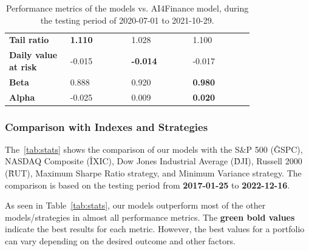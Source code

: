 \documentclass[../xlapes02]{subfiles}
\begin{document}
\begin{table}[h!]
{\begin{tabular}{*{4}{|m{0.20\linewidth}|}}
                \bfseries Tail ratio          & \color[HTML]{00F000} \bfseries 1.110 & 1.028                                 & 1.100 \\[0.5cm]
                \bfseries Daily value at risk & -0.015                               & \color[HTML]{00F000} \bfseries -0.014 & -0.017 \\[0.5cm]
                \bfseries Beta                & 0.888                                & 0.920                                 & \color[HTML]{00F000} \bfseries 0.980 \\[0.5cm]
                \bfseries Alpha               & -0.025                               & 0.009                                 & \color[HTML]{00F000} \bfseries 0.020 \\[0.5cm]
                \bottomrule
            \end{tabular}
        }
        \caption{Performance metrics of the models vs. AI4Finance model, during the testing period of 2020-07-01 to 2021-10-29.}
        \label{tab:stats2}
    \end{table}

    \subsubsection{Comparison with Indexes and Strategies}\label{subsubsec:indexes-and-strategies}
    The~\cref{tab:stats} shows the comparison of our models with the S\&P 500 (\^GSPC), NASDAQ Composite (\^IXIC), Dow Jones Industrial Average (\^DJI), Russell 2000 (\^RUT), Maximum Sharpe Ratio strategy, and Minimum Variance strategy. The comparison is based on the testing period from \textbf{2017-01-25} to \textbf{2022-12-16}.

    As seen in Table~\cref{tab:stats}, our models outperform most of the other models/strategies in almost all performance metrics. The \textcolor[HTML]{00F000}{\textbf{green bold values}} indicate the best results for each metric. However, the best values for a portfolio can vary depending on the desired outcome and other factors.
\end{document}
